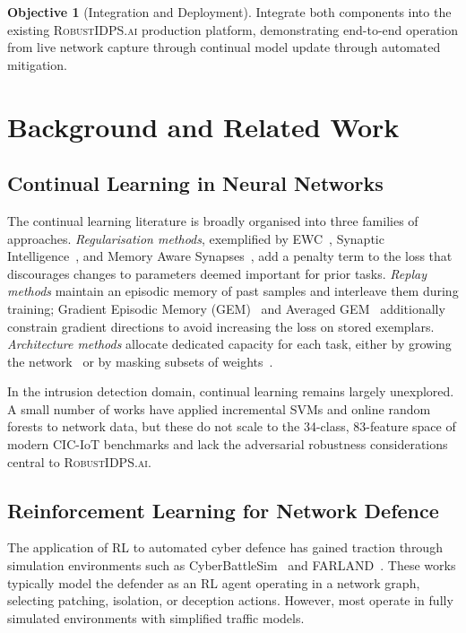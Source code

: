 \documentclass[12pt,a4paper]{article}
\newcommand{\RobustIDPS}{\textsc{RobustIDPS.ai}}
\theoremstyle{definition}
\newtheorem{objective}{Objective}[section]
\begin{document}
\begin{objective}[Integration and Deployment]
Integrate both components into the existing \RobustIDPS{} production platform, demonstrating end-to-end operation from live network capture through continual model update through automated mitigation.
\end{objective}


\section{Background and Related Work}
\label{sec:background}

\subsection{Continual Learning in Neural Networks}

The continual learning literature is broadly organised into three families of approaches.
\emph{Regularisation methods}, exemplified by EWC~\cite{kirkpatrick2017}, Synaptic Intelligence~\cite{zenke2017}, and Memory Aware Synapses~\cite{aljundi2018}, add a penalty term to the loss that discourages changes to parameters deemed important for prior tasks.
\emph{Replay methods} maintain an episodic memory of past samples and interleave them during training; Gradient Episodic Memory (GEM)~\cite{lopezpaz2017} and Averaged GEM~\cite{chaudhry2019} additionally constrain gradient directions to avoid increasing the loss on stored exemplars.
\emph{Architecture methods} allocate dedicated capacity for each task, either by growing the network~\cite{rusu2016} or by masking subsets of weights~\cite{serra2018}.

In the intrusion detection domain, continual learning remains largely unexplored.
A small number of works have applied incremental SVMs and online random forests to network data, but these do not scale to the 34-class, 83-feature space of modern CIC-IoT benchmarks and lack the adversarial robustness considerations central to \RobustIDPS{}.

\subsection{Reinforcement Learning for Network Defence}

The application of RL to automated cyber defence has gained traction through simulation environments such as CyberBattleSim~\cite{cyberbattlesim2021} and FARLAND~\cite{molina2021}.
These works typically model the defender as an RL agent operating in a network graph, selecting patching, isolation, or deception actions.
However, most operate in fully simulated environments with simplified traffic models.
\end{document}
